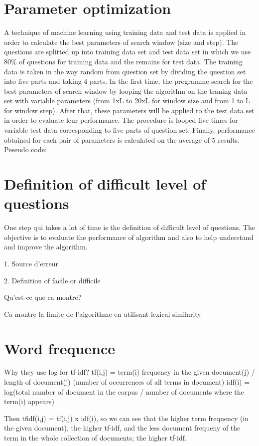 \documentclass[12pt, a4paper]{report}
\begin{document}
\chapter{Parameter optimization}
A technique of machine learning using training data and test data is applied in order to calculate the best parameters of search window (size and step).
The questions are splitted up into training data set and test data set in which we use 80\% of questions for training data and the remains for test data. The training data is taken in the way random from question set by dividing the question set into five parts and taking 4 parts.
In the first time, the programme search for the best parameters of search window by looping the algorithm on the traning data set with variable parameters (from 1xL to 20xL for window size and from 1 to L for window step). After that, these parameters will be applied to the test data set in order to evaluate leur performance.
The procedure is looped five times for variable test data corresponding to five parts of question set. Finally, performance obtained for each pair of parameters is calculated on the average of 5 results.
Peseudo code:

\newpage
\chapter{Definition of difficult level of questions}
One step qui takes a lot of time is the definition of difficult level of questions. The objective is to evaluate the performance of algorithm and also to help understand and improve the algorithm.

1. Source d'erreur

2. Definition of facile or difficile 

Qu'est-ce que ca montre?

Ca montre la limite de l'algorithme en utilisant lexical similarity

\newpage
\chapter{Word frequence}
Why they use log for tf-idf?
tf(i,j) = term(i) frequency in the given document(j) / length of document(j) (number of occurrences of all terms in document)
idf(i) = log(total number of document in the corpus / number of documents where the term(i) appears)

Then tfidf(i,j) = tf(i,j) x idf(i), so we can see that the higher term frequency (in the given document), the higher tf-idf, and the less document frequeny of the term in the whole collection of documents; the higher tf-idf.
\end{document}
